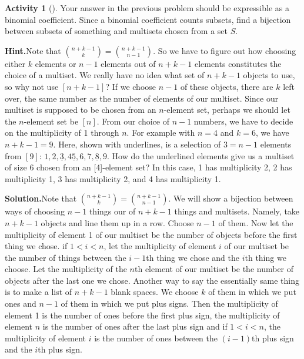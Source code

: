 \documentclass[10pt,]{book}
\theoremstyle{plain}
\theoremstyle{definition}
\newtheorem{activity}[project]{Activity}
\numberwithin{equation}{chapter}
\newcommand{\lt}{<}
\begin{document}
\begin{activity}[]\label{activity-116}
Your answer in the previous problem should be expressible as a binomial coefficient. Since a binomial coefficient counts subsets, find a bijection between subsets of something and multisets chosen from a set \(S\).%
\par\medskip\noindent%
\textbf{Hint.}\quad Note that \(\binom{n+k−1}{k} = \binom{n+k-1}{n-1}\). So we have to figure out how choosing either \(k\) elements or \(n − 1\) elements out of \(n + k − 1\) elements constitutes the choice of a multiset. We really have no idea what set of \(n + k − 1\) objects to use, so why not use \([n + k − 1]\)? If we choose \(n − 1\) of these objects, there are \(k\) left over, the same number as the number of elements of our multiset. Since our multiset is supposed to be chosen from an \(n\)-element set, perhaps we should let the \(n\)-element set be \([n]\). From our choice of \(n − 1\) numbers, we have to decide on the multiplicity of 1 through \(n\). For example with \(n = 4\) and \(k = 6\), we have \(n+k-1=9\). Here, shown with underlines, is a selection of \(3=n-1\) elements from \([9]\): \(1, 2, \underline{3}, 4 \underline{5}, 6, 7, \underline{8}, 9\). How do the underlined elements give us a multiset of size 6 chosen from an [4]-element set? In this case, 1 has multiplicity 2, 2 has multiplicity 1, 3 has multiplicity 2, and 4 has multiplicity 1.%
\par\medskip\noindent%
\textbf{Solution.}\quad Note that \(\binom{n+k-1}{k} = \binom{n+k-1}{n-1}\). We will show a bijection between ways of choosing \(n-1\) things our of \(n+k-1\) things and multisets. Namely, take \(n+k-1\) objects and line them up in a row. Choose \(n-1\) of them. Now let the multiplicity of element 1 of our multiset be the number of objects before the first thing we chose.  if \(1\lt i\lt n\), let the multiplicity of element \(i\) of our multiset be the number of things between the \(i-1\)th thing we chose and the \(i\)th thing we choose. Let the multiplicity of the \(n\)th element of our multiset be the number of objects after the last one we chose. Another way to say the essentially same thing is to make a list of \(n+k-1\) blank spaces. We choose \(k\) of them in which we put ones and \(n-1\) of them in which we put plus signs. Then the multiplicity of element 1 is the number of ones before the first plus sign, the multiplicity of element \(n\) is the number of ones after the last plus sign and if \(1\lt i\lt n\), the multiplicity of element \(i\) is the number of ones between the \((i-1)\)th plus sign and the \(i\)th plus sign.%
\end{activity}
\end{document}
